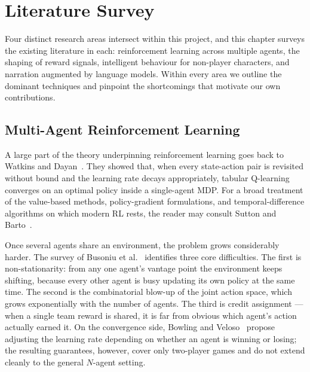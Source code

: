 \documentclass[12pt, a4paper, oneside]{report}
\begin{document}
\chapter{Literature Survey}
\label{chap:literature}

Four distinct research areas intersect within this project, and this chapter surveys the existing literature in each: reinforcement learning across multiple agents, the shaping of reward signals, intelligent behaviour for non-player characters, and narration augmented by language models. Within every area we outline the dominant techniques and pinpoint the shortcomings that motivate our own contributions.

\section{Multi-Agent Reinforcement Learning}
\label{sec:marl}

A large part of the theory underpinning reinforcement learning goes back to Watkins and Dayan~\cite{watkins1992qlearning}. They showed that, when every state-action pair is revisited without bound and the learning rate decays appropriately, tabular Q-learning converges on an optimal policy inside a single-agent MDP. For a broad treatment of the value-based methods, policy-gradient formulations, and temporal-difference algorithms on which modern RL rests, the reader may consult Sutton and Barto~\cite{sutton2018rl}.

Once several agents share an environment, the problem grows considerably harder. The survey of Busoniu et al.~\cite{busoniu2008marl} identifies three core difficulties. The first is non-stationarity: from any one agent's vantage point the environment keeps shifting, because every other agent is busy updating its own policy at the same time. The second is the combinatorial blow-up of the joint action space, which grows exponentially with the number of agents. The third is credit assignment --- when a single team reward is shared, it is far from obvious which agent's action actually earned it. On the convergence side, Bowling and Veloso~\cite{bowling2002multiagent} propose adjusting the learning rate depending on whether an agent is winning or losing; the resulting guarantees, however, cover only two-player games and do not extend cleanly to the general $N$-agent setting.
\end{document}
